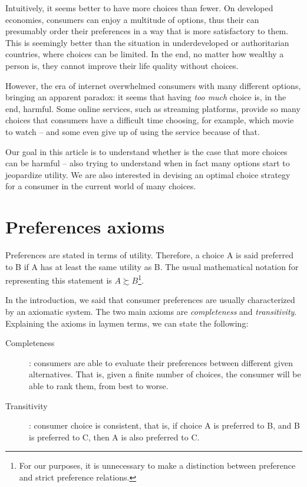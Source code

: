 \documentclass[12pt, letterpaper]{article}
\begin{document}
	Intuitively, it seems better to have more choices than fewer. On developed economies, consumers can enjoy a multitude of options, thus their can presumably order their preferences in a way that is more satisfactory to them. This is seemingly better than the situation in underdeveloped or authoritarian countries, where choices can be limited. In the end, no matter how wealthy a person is, they cannot improve their life quality without choices. 
	
	However, the era of internet overwhelmed consumers with many different options, bringing an apparent paradox: it seems that having \textit{too much} choice is, in the end, harmful. Some online services, such as streaming platforms, provide so many choices that consumers have a difficult time choosing, for example,  which movie to watch -- and some even give up of using the service because of that.
	
	Our goal in this article is to understand whether is the case that more choices can be harmful -- also trying to understand when in fact many options start to jeopardize utility. We are also interested in devising an optimal choice strategy for a consumer in the current world of many choices. 


	\section{Preferences axioms}
	Preferences are stated in terms of utility. Therefore, a choice A is said preferred to B if A has at least the same utility as B. The usual mathematical notation for representing this statement is $A \succsim B$\footnote{For our purposes, it is unnecessary to make a distinction between preference and strict preference relations.}.
	
	In the introduction, we said that consumer preferences are usually characterized by an axiomatic system. The two main axioms are \textit{completeness} and \textit{transitivity}. Explaining the axioms in laymen terms, we can state the following:
	
	\begin{description}
		\item[Completeness]: consumers are able to evaluate their preferences between different given alternatives. That is, given a finite number of choices, the consumer will be able to rank them, from best to worse.
		\item[Transitivity]: consumer choice is consistent, that is, if choice A is preferred to B, and B is preferred to C, then A is also preferred to C. 
	\end{description}
\end{document}
